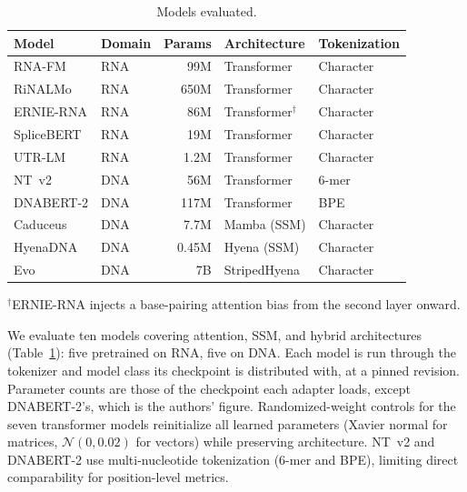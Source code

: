 \documentclass[11pt]{article}
\begin{document}
\begin{table}[htbp]
\centering
\caption{Models evaluated.}
\label{tab:models}
\begin{tabular}{@{}llrll@{}}
\toprule
\textbf{Model} & \textbf{Domain} & \textbf{Params} & \textbf{Architecture} & \textbf{Tokenization} \\
\midrule
RNA-FM \citep{rnafm}                    & RNA & 99M  & Transformer           & Character \\
RiNALMo \citep{rinalmo}                 & RNA & 650M & Transformer           & Character \\
ERNIE-RNA \citep{yin2025ernierna}        & RNA & 86M  & Transformer$^\dagger$ & Character \\
SpliceBERT \citep{chen2024splicebert}     & RNA & 19M  & Transformer           & Character \\
UTR-LM \citep{chu2024utrlm}             & RNA & 1.2M & Transformer           & Character \\
NT~v2 \citep{dalla2023nucleotide}        & DNA & 56M  & Transformer           & 6-mer     \\
DNABERT-2 \citep{zhou2024dnabert2}       & DNA & 117M & Transformer           & BPE       \\
Caduceus \citep{schiff2024caduceus}      & DNA & 7.7M & Mamba (SSM)           & Character \\
HyenaDNA \citep{nguyen2024hyenadna}      & DNA & 0.45M & Hyena (SSM)          & Character \\
Evo \citep{nguyen2024evo}                & DNA & 7B   & StripedHyena          & Character \\
\bottomrule
\end{tabular}
\medskip

\small $^\dagger$ERNIE-RNA injects a base-pairing attention bias from the
second layer onward.
\end{table}

We evaluate ten models covering attention, SSM, and hybrid architectures
(Table~\ref{tab:models}): five pretrained on RNA, five on DNA. Each model is
run through the tokenizer and model class its checkpoint is distributed with,
at a pinned revision. Parameter counts are those of the checkpoint each adapter
loads, except DNABERT-2's, which is the authors' figure.
Randomized-weight controls for the seven transformer models reinitialize all
learned parameters (Xavier normal for matrices, $\mathcal{N}(0, 0.02)$
for vectors) while preserving architecture. NT~v2 and DNABERT-2 use
multi-nucleotide tokenization (6-mer and BPE), limiting direct
comparability for position-level metrics.
\end{document}
